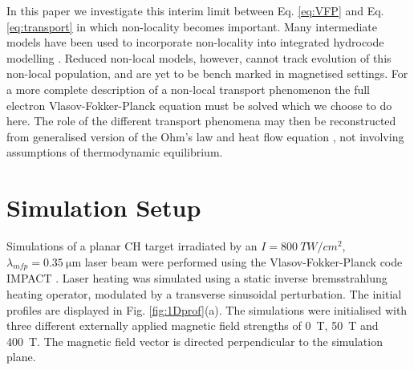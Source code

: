 \documentclass[aip,reprint]{revtex4-1}
\begin{document}
 In this paper we investigate this interim limit between Eq. \ref{eq:VFP} and Eq. \ref{eq:transport} in which non-locality becomes important. Many intermediate models have been used to incorporate non-locality into integrated hydrocode modelling \cite{Schurtz2000,Nicolai2006a,Manheimer2008}. Reduced non-local models, however, cannot track evolution of this non-local population, and are yet to be bench marked in magnetised settings.  For a more complete description of a non-local transport phenomenon the full electron Vlasov-Fokker-Planck equation must be solved which we choose to do here.  The role of the different transport phenomena may then be reconstructed from generalised version of the Ohm's law and heat flow equation \cite{Luciani1983,Williams2013}, not involving assumptions of thermodynamic equilibrium. 


% 


\section{Simulation Setup}
\label{sec:simulationsetup}
Simulations of a planar CH target irradiated by an $I = \SI{800}{TW/cm^2}$, $\lambda_{mfp} = \SI{0.35}{\micro\meter}$ laser beam were performed using the Vlasov-Fokker-Planck code IMPACT \cite{Kingham2002}. Laser heating was simulated using a static inverse bremsstrahlung heating operator\cite{Langdon1980}, modulated by a transverse sinusoidal perturbation.  The initial profiles are displayed in Fig. \ref{fig:1Dprof}(a). The simulations were initialised with three different externally applied magnetic field strengths of  \SI{0}{T}, \SI{50}{T} and \SI{400}{T}. The magnetic field vector is directed perpendicular to the simulation plane.
\end{document}
